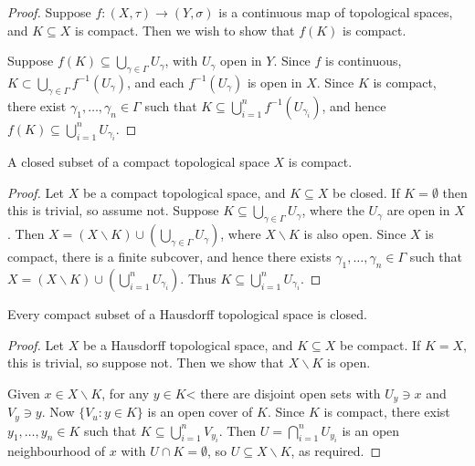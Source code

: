 \begin{proof}
	Suppose $f:(X,\tau)\to(Y,\sigma)$ is a continuous map of topological spaces, and $K\subseteq X$ is compact. Then we wish to show that $f(K)$ is compact.

	Suppose $f(K)\subseteq\bigcup_{\gamma\in\Gamma} U_\gamma$, with $U_\gamma$ open in $Y$. Since $f$ is continuous, $K\subset\bigcup_{\gamma\in\Gamma} f^{-1}(U_\gamma)$, and each $f^{-1}(U_\gamma)$ is open in $X$. Since $K$ is compact, there exist $\gamma_1,\ldots,\gamma_n \in \Gamma$ such that $K\subseteq\bigcup_{i=1}^n f^{-1}(U_{\gamma_i})$, and hence $f(K)\subseteq\bigcup_{i=1}^n U_{\gamma_i}$. %
\end{proof}

\begin{proposition}
	A closed subset of a compact topological space $X$ is compact. \label{prop:closed-compact}
\end{proposition}

\begin{proof}
	Let $X$ be a compact topological space, and $K\subseteq X$ be closed. If $K=\emptyset$ then this is trivial, so assume not. Suppose $K\subseteq \bigcup_{\gamma\in\Gamma} U_\gamma$, where the $U_\gamma$ are open in $X$. Then $X=(X\backslash K)\cup\left( \bigcup_{\gamma\in\Gamma}U_\gamma \right)$, where $X\backslash K$ is also open. Since $X$ is compact, there is a finite subcover, and hence there exists $\gamma_1,\ldots,\gamma_n \in \Gamma$ such that $X=(X\backslash K) \cup \left( \bigcup_{i=1}^n U_{\gamma_i} \right)$. Thus $K\subseteq \bigcup_{i=1}^n U_{\gamma_i}$.
\end{proof}

\begin{proposition}
	Every compact subset of a Hausdorff topological space is closed. \label{prop:compact-hausdorff-closed}
\end{proposition}

\begin{proof}
	Let $X$ be a Hausdorff topological space, and $K \subseteq X$ be compact. If $K=X$, this is trivial, so suppose not. Then we show that $X\backslash K$ is open. 


	Given $x\in X\backslash K$, for any $y\in K$< there are disjoint open sets with $U_y \ni x$ and $V_y \ni y$. Now $\{V_u: y\in K\}$ is an open cover of $K$. Since $K$ is compact, there exist $y_1,\ldots,y_n \in K$ such that $K \subseteq \bigcup_{i=1}^n V_{y_i}$. Then $U=\bigcap_{i=1}^n U_{y_i}$ is an open neighbourhood of $x$ with $U\cap K = \emptyset$, so $U\subseteq X\backslash K$, as required.
\end{proof}


